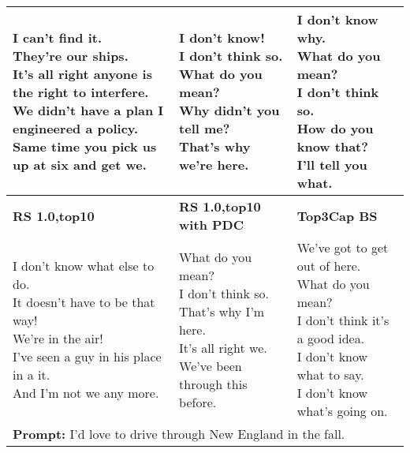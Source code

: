 \documentclass[thesis.tex]{subfiles}
\begin{document}
\begin{table*}[t]
\begin{tabular}{|l|l|l|}
\makecell[l]{
I can't find it. \\
They're our ships. \\
\tiny It's all right anyone is the right to interfere. \\
\tiny We didn't have a plan I engineered a policy. \\
\tiny Same time you pick us up at six and get we. \\
}&
\makecell[l]{
I don't know! \\
I don't think so. \\
What do you mean? \\
Why didn't you tell me? \\
That's why we're here. \\
}&
\makecell[l]{
I don't know why. \\
What do you mean? \\
I don't think so. \\
How do you know that? \\
I'll tell you what. \\
}
\\
    \hline
    \hline
    \footnotesize \textbf{RS 1.0,top10} & \footnotesize \textbf{RS 1.0,top10 with PDC} &  \footnotesize \textbf{Top3Cap BS} \\
    \hline
\makecell[l]{
I don't know what else to do. \\
It doesn't have to be that way! \\
We're in the air! \\
I've seen a guy in his place in a it. \\
And I'm not we any more. \\
}&
\makecell[l]{
What do you mean? \\
I don't think so. \\
That's why I'm here. \\
It's all right we. \\
We've been through this before. \\
}&
\makecell[l]{
We've got to get out of here. \\
What do you mean? \\
I don't think it's a good idea. \\
I don't know what to say. \\
I don't know what's going on. \\
} \\
\hline \hline
    \multicolumn{3}{|l|}{\rule{0pt}{0.35cm} \normalsize \textbf{Prompt:} I'd love to drive through New England in the fall.}  \\ 

\end{tabular}
\end{table*}
\end{document}
